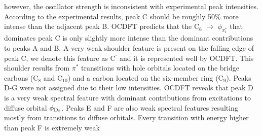 \documentclass{article}
\begin{document}
however, the oscillator strength is inconsistent with experimental peak intensities. According to the experimental results, peak C should be roughly 50\% more intense than the adjacent peak B. OCDFT predicts that the C$_6$ $\rightarrow$ $\phi_{\pi^*_1}$ that dominates peak C is only slightly more intense than the dominant contributions to peaks A and B. A very weak shoulder feature is present on the falling edge of peak C, we denote this feature as C$^{\prime}$ and it is represented well by OCDFT. This shoulder results from $\pi^*$ transitions with hole orbitals located on the bridge carbons (C$_8$ and C$_{10}$) and a carbon located on the six-member ring (C$_9$). Peaks D-G were not assigned due to their low intensities. OCDFT reveals that peak D is a very weak spectral feature with dominant contributions from excitations to diffuse orbital $\phi_{\rm D_3}$. Peaks E and F are also weak spectral features resulting mostly from transitions to diffuse orbitals. Every transition with energy higher than peak F is extremely weak 
\end{document}
